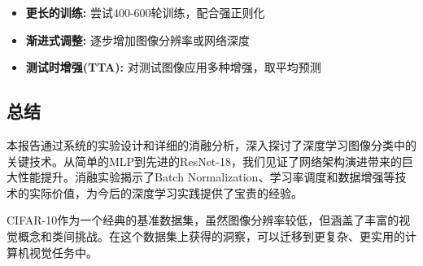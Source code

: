 \documentclass[12pt,a4paper]{article}
\begin{document}
\begin{itemize}[leftmargin=2em]
    \item \textbf{更长的训练:} 尝试400-600轮训练，配合强正则化
    \item \textbf{渐进式调整:} 逐步增加图像分辨率或网络深度
    \item \textbf{测试时增强(TTA):} 对测试图像应用多种增强，取平均预测
\end{itemize}

\subsection{总结}

本报告通过系统的实验设计和详细的消融分析，深入探讨了深度学习图像分类中的关键技术。从简单的MLP到先进的ResNet-18，我们见证了网络架构演进带来的巨大性能提升。消融实验揭示了Batch Normalization、学习率调度和数据增强等技术的实际价值，为今后的深度学习实践提供了宝贵的经验。

CIFAR-10作为一个经典的基准数据集，虽然图像分辨率较低，但涵盖了丰富的视觉概念和类间挑战。在这个数据集上获得的洞察，可以迁移到更复杂、更实用的计算机视觉任务中。

\newpage
\printbibliography
\end{document}
